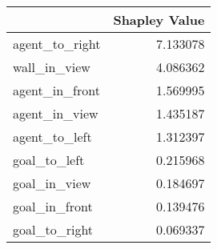 \begin{tabular}{lr}
\toprule
 & Shapley Value \\
\midrule
agent\_to\_right & 7.133078 \\
wall\_in\_view & 4.086362 \\
agent\_in\_front & 1.569995 \\
agent\_in\_view & 1.435187 \\
agent\_to\_left & 1.312397 \\
goal\_to\_left & 0.215968 \\
goal\_in\_view & 0.184697 \\
goal\_in\_front & 0.139476 \\
goal\_to\_right & 0.069337 \\
\bottomrule
\end{tabular}